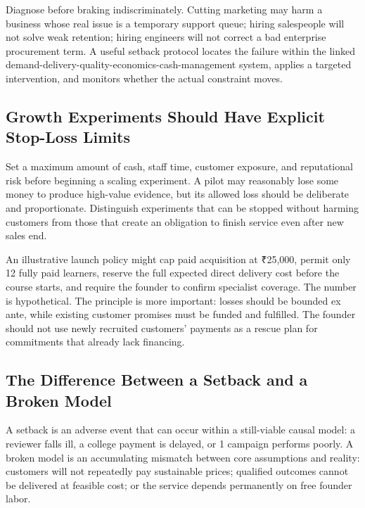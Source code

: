 Diagnose before braking indiscriminately. Cutting marketing may harm a business whose real issue is a temporary support queue; hiring salespeople will not solve weak retention; hiring engineers will not correct a bad enterprise procurement term. A useful setback protocol locates the failure within the linked demand\allowbreak-delivery\allowbreak-quality\allowbreak-economics\allowbreak-cash\allowbreak-management system, applies a targeted intervention, and monitors whether the actual constraint moves.

\subsection{Growth Experiments Should Have Explicit Stop-Loss Limits}
\label{sec:growth_experiments_stop_loss}

Set a maximum amount of cash, staff time, customer exposure, and reputational risk before beginning a scaling experiment. A pilot may reasonably lose some money to produce high-value evidence, but its allowed loss should be deliberate and proportionate. Distinguish experiments that can be stopped without harming customers from those that create an obligation to finish service even after new sales end.

An illustrative launch policy might cap paid acquisition at ₹25,000, permit only 12 fully paid learners, reserve the full expected direct delivery cost before the course starts, and require the founder to confirm specialist coverage. The number is hypothetical. The principle is more important: losses should be bounded ex ante, while existing customer promises must be funded and fulfilled. The founder should not use newly recruited customers' payments as a rescue plan for commitments that already lack financing.

\subsection{The Difference Between a Setback and a Broken Model}
\label{sec:setback_versus_broken_model}

A setback is an adverse event that can occur within a still-viable causal model: a reviewer falls ill, a college payment is delayed, or 1 campaign performs poorly. A broken model is an accumulating mismatch between core assumptions and reality: customers will not repeatedly pay sustainable prices; qualified outcomes cannot be delivered at feasible cost; or the service depends permanently on free founder labor.

